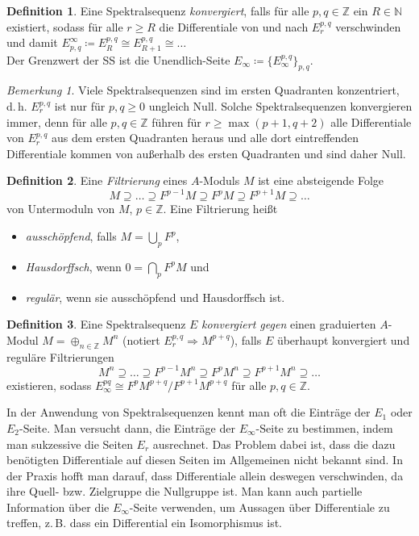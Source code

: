 \documentclass[11pt, a4paper, german]{article}
\theoremstyle{definition}
\newtheorem{defn}{Definition}
\theoremstyle{remark}
\newtheorem*{bem}{Bemerkung}
\newcommand{\N}{\mathbb{N}} %
\newcommand{\Z}{\mathbb{Z}} %
\renewcommand{\dh}{d.\,h.} %
\begin{document}
\begin{defn}
  Eine Spektralsequenz \emph{konvergiert}, falls für alle $p, q \in \Z$ ein $R \in \N$ existiert, sodass für alle $r \geq R$ die Differentiale von und nach $E_r^{p,q}$ verschwinden und damit $E^\infty_{p,q} \coloneqq E_R^{p,q} \cong E_{R+1}^{p,q} \cong \ldots$ \\[2pt]
  Der Grenzwert der SS ist die Unendlich-Seite $E_\infty \coloneqq \{ E_\infty^{p,q} \}_{p,q}$.
\end{defn}

\begin{bem}
  Viele Spektralsequenzen sind im ersten Quadranten konzentriert, \dh{} $E_r^{p,q}$ ist nur für $p, q \geq 0$ ungleich Null.
  Solche Spektralsequenzen konvergieren immer, denn für alle $p, q \in \Z$ führen für $r \geq \max(p+1, q+2)$ alle Differentiale von $E_r^{p,q}$ aus dem ersten Quadranten heraus und alle dort eintreffenden Differentiale kommen von außerhalb des ersten Quadranten und sind daher Null.
\end{bem}

\begin{defn}
  Eine \emph{Filtrierung} eines $A$-Moduls $M$ ist eine absteigende Folge
  \[ M \supseteq \ldots \supseteq F^{p-1} M \supseteq F^p M \supseteq F^{p+1} M \supseteq \ldots \]
  von Untermoduln von $M$, $p \!\in\! \Z$.
  Eine Filtrierung heißt
  \begin{itemize}
    \item \emph{ausschöpfend}, falls $M = \bigcup_p F^p$,
    \item \emph{Hausdorffsch}, wenn $0 = \bigcap_p F^p M$ und
    \item \emph{regulär}, wenn sie ausschöpfend und Hausdorffsch ist.
  \end{itemize}
\end{defn}

\begin{defn}
  Eine Spektralsequenz $E$ \emph{konvergiert gegen} einen graduierten $A$-Modul $M = \oplus_{n \in \Z} M^n$ (notiert $E_r^{p,q} \Rightarrow M^{p+q}$), falls $E$ überhaupt konvergiert und reguläre Filtrierungen
  \[ M^n \supseteq \ldots \supseteq F^{p-1} M^n \supseteq F^p M^n \supseteq F^{p+1} M^n \supseteq \ldots \]
  existieren, sodass $E_\infty^{pq} \cong F^p M^{p+q} / F^{p+1} M^{p+q}$ für alle $p, q \in \Z$.
\end{defn}

In der Anwendung von Spektralsequenzen kennt man oft die Einträge der $E_1$ oder $E_2$-Seite.
Man versucht dann, die Einträge der $E_\infty$-Seite zu bestimmen, indem man sukzessive die Seiten $E_r$ ausrechnet.
Das Problem dabei ist, dass die dazu benötigten Differentiale auf diesen Seiten im Allgemeinen nicht bekannt sind.
In der Praxis hofft man darauf, dass Differentiale allein deswegen verschwinden, da ihre Quell- bzw. Zielgruppe die Nullgruppe ist.
Man kann auch partielle Information über die $E_\infty$-Seite verwenden, um Aussagen über Differentiale zu treffen, z.\,B. dass ein Differential ein Isomorphismus ist.
\end{document}

